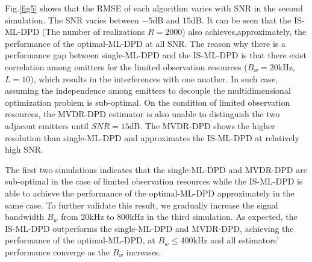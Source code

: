 \documentclass[review]{elsarticle}
\begin{document}
Fig.\ref{fig5} shows that the RMSE of each algorithm varies with SNR in the second simulation. The SNR varies between $-5$dB and $15$dB. It can be seen that the IS-ML-DPD (The number of realizations $R=2000$) also achieves,approximately, the performance of the optimal-ML-DPD at all SNR. The reason why there is a performance gap between single-ML-DPD and the IS-ML-DPD is that there exist correlation among emitters for the limited observation resources ($B_w=20$kHz,$L=10$), which results in the interferences with one another. In such case, assuming the independence among emitters to decouple the multidimensional optimization problem is sub-optimal. On the condition of limited observation resources, the MVDR-DPD estimator is also unable to distinguish the two adjacent emitters until $SNR= 15$dB. The MVDR-DPD shows the higher resolution than single-ML-DPD and approximates the IS-ML-DPD at relatively high SNR.

The first two simulations indicates that the single-ML-DPD and MVDR-DPD are sub-optimal in the case of limited observation resources while the IS-ML-DPD is able to achieve the performance of the optimal-ML-DPD approximately in the same case. To further validate this result, we gradually increase the signal bandwidth $B_w$ from $20$kHz to $800$kHz in the third simulation. As expected, the IS-ML-DPD outperforms the single-ML-DPD and MVDR-DPD, achieving the performance of the optimal-ML-DPD, at $B_w\leq400$kHz and all estimators' performance converge as the $B_w$ increases.
\end{document}
